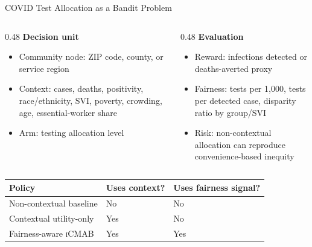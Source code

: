 \documentclass[aspectratio=169,10pt]{beamer}
\newcommand{\icmab}{\textsc{iCMAB}}
\begin{document}
\begin{frame}{COVID Test Allocation as a Bandit Problem}
\begin{columns}[T]
\begin{column}{0.48\textwidth}
\textbf{Decision unit}
\begin{itemize}
    \item Community node: ZIP code, county, or service region
    \item Context: cases, deaths, positivity, race/ethnicity, SVI, poverty, crowding, age, essential-worker share
    \item Arm: testing allocation level
\end{itemize}
\end{column}
\begin{column}{0.48\textwidth}
\textbf{Evaluation}
\begin{itemize}
    \item Reward: infections detected or deaths-averted proxy
    \item Fairness: tests per 1,000, tests per detected case, disparity ratio by group/SVI
    \item Risk: non-contextual allocation can reproduce convenience-based inequity
\end{itemize}
\end{column}
\end{columns}

\vspace{0.8em}
\begin{center}
\small
\begin{tabular}{lll}
\toprule
Policy & Uses context? & Uses fairness signal? \\
\midrule
Non-contextual baseline & No & No \\
Contextual utility-only & Yes & No \\
Fairness-aware \icmab & Yes & Yes \\
\bottomrule
\end{tabular}
\end{center}
\end{frame}
\end{document}
